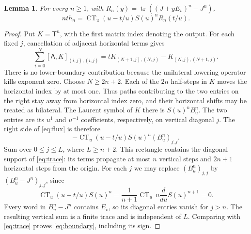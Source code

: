 \documentclass[11pt]{article}
\newtheorem{lemma}[theorem]{Lemma}
\DeclareMathOperator{\CT}{CT}
\DeclareMathOperator{\tr}{tr}
\newcommand{\A}{\mathsf A}
\newcommand{\T}{\mathsf T}
\begin{document}
\begin{lemma}\label{lem:boundary}
For every $n\geq1$, with
$R_n(y)=\tr((J+yE_v)^n-J^n)$,
\begin{equation}\label{eq:boundary}
 nt h_n=\CT_u (u-t/u)S(u)^nR_n(t/u).
\end{equation}
\end{lemma}
\begin{proof}
Put $K=\T^n$, with the first matrix index denoting the output. For each
fixed $j$, cancellation of adjacent horizontal terms gives
\begin{equation}\label{eq:flux}
 \sum_{i=0}^N[\A,K]_{(i,j),(i,j)}
       =tK_{(N+1,j),(N,j)}-K_{(N,j),(N+1,j)}.
\end{equation}
There is no lower-boundary contribution because the unilateral lowering
operator kills exponent zero. Choose $N\geq2n+2$. Each of the $2n$
half-steps in $K$ moves the horizontal index by at most one. Thus paths
contributing to the two entries on the right stay away from horizontal
index zero, and their horizontal shifts may be treated as bilateral.
The Laurent symbol of $K$ there is $S(u)^nB_u^n$. The two entries are its
$u^1$ and $u^{-1}$ coefficients, respectively, on vertical diagonal $j$.
The right side of \eqref{eq:flux} is therefore
\[
 -\CT_u(u-t/u)S(u)^n(B_u^n)_{j,j}.
\]
Sum over $0\leq j\leq L$, where $L\geq n+2$. This rectangle contains
the diagonal support of \eqref{eq:trace}: its terms propagate at most
$n$ vertical steps and $2n+1$ horizontal steps from the origin.
For each $j$ we may replace $(B_u^n)_{j,j}$ by
$(B_u^n-J^n)_{j,j}$, since
\[
 \CT_u(u-t/u)S(u)^n
   =\frac{1}{n+1}\CT_u\,u\frac{d}{du}S(u)^{n+1}=0.
\]
Every word in $B_u^n-J^n$ contains $E_v$, so its diagonal entries vanish
for $j>n$. The resulting vertical sum is a finite trace and is independent
of $L$. Comparing with \eqref{eq:trace} proves \eqref{eq:boundary},
including its sign.
\end{proof}
\end{document}
